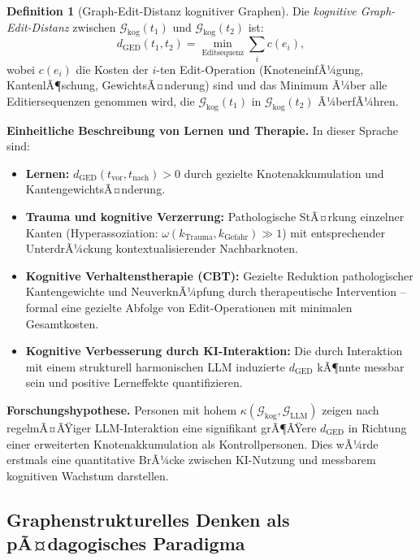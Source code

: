 ﻿\documentclass[12pt,a4paper]{article}
\theoremstyle{plain}
\theoremstyle{definition}
\newtheorem{definition}[theorem]{Definition}
\theoremstyle{remark}
\newcommand{\GG}{\mathcal{G}}
\begin{document}
\begin{definition}[Graph-Edit-Distanz kognitiver Graphen]
Die \emph{kognitive Graph-Edit-Distanz} zwischen $\GG_{\text{kog}}(t_1)$ und $\GG_{\text{kog}}(t_2)$ ist:
\[
  d_{\text{GED}}(t_1, t_2) = \min_{\text{Editsequenz}} \sum_{i} c(e_i),
\]
wobei $c(e_i)$ die Kosten der $i$-ten Edit-Operation (KnoteneinfÃ¼gung, KantenlÃ¶schung, GewichtsÃ¤nderung) sind und das Minimum Ã¼ber alle Editiersequenzen genommen wird, die $\GG_{\text{kog}}(t_1)$ in $\GG_{\text{kog}}(t_2)$ Ã¼berfÃ¼hren.
\end{definition}

\textbf{Einheitliche Beschreibung von Lernen und Therapie.} In dieser Sprache sind:
\begin{itemize}
  \item \textbf{Lernen:} $d_{\text{GED}}(t_{\text{vor}}, t_{\text{nach}}) > 0$ durch gezielte Knotenakkumulation und KantengewichtsÃ¤nderung.
  \item \textbf{Trauma und kognitive Verzerrung:} Pathologische StÃ¤rkung einzelner Kanten (Hyperassoziation: $\omega(k_{\text{Trauma}}, k_{\text{Gefahr}}) \gg 1$) mit entsprechender UnterdrÃ¼ckung kontextualisierender Nachbarknoten.
  \item \textbf{Kognitive Verhaltenstherapie (CBT):} Gezielte Reduktion pathologischer Kantengewichte und NeuverknÃ¼pfung durch therapeutische Intervention -- formal eine gezielte Abfolge von Edit-Operationen mit minimalen Gesamtkosten.
  \item \textbf{Kognitive Verbesserung durch KI-Interaktion:} Die durch Interaktion mit einem strukturell harmonischen LLM induzierte $d_{\text{GED}}$ kÃ¶nnte messbar sein und positive Lerneffekte quantifizieren.
\end{itemize}

\textbf{Forschungshypothese.} Personen mit hohem $\kappa(\GG_{\text{kog}}, \GG_{\text{LLM}})$ zeigen nach regelmÃ¤ÃŸiger LLM-Interaktion eine signifikant grÃ¶ÃŸere $d_{\text{GED}}$ in Richtung einer erweiterten Knotenakkumulation als Kontrollpersonen. Dies wÃ¼rde erstmals eine quantitative BrÃ¼cke zwischen KI-Nutzung und messbarem kognitiven Wachstum darstellen.

\subsection{Graphenstrukturelles Denken als pÃ¤dagogisches Paradigma}
\label{subsec:paedagogik}
\end{document}
